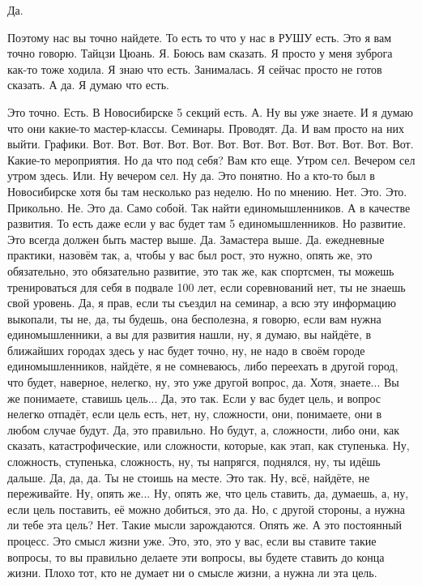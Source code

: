 \I
Да.

\A
Поэтому нас вы точно найдете.
То есть то что у нас в РУШУ есть.
Это я вам точно говорю.
Тайцзи Цюань.
Я.
Боюсь вам сказать.
Я просто у меня зуброга как-то тоже ходила.
Я знаю что есть.
Занималась.
Я сейчас просто не готов сказать.
А да.
Я думаю что есть.

\I
Это точно.
Есть.
В Новосибирске 5 секций есть.
А.
Ну вы уже знаете.
И я думаю что они какие-то мастер-классы.
Семинары.
Проводят.
Да.
И вам просто на них выйти.
Графики.
Вот.
Вот.
Вот.
Вот.
Вот.
Вот.
Вот.
Вот.
Вот.
Вот.
Вот.
Вот.
Вот.
Какие-то мероприятия.
Но да что под себя?
Вам кто еще.
Утром сел.
Вечером сел утром здесь.
Или.
Ну вечером сел.
Ну да.
Это понятно.
Но а кто-то был в Новосибирске хотя бы там несколько раз
неделю.
Но по мнению.
Нет.
Это.
Это.
Прикольно.
Не.
Это да.
Само собой.
Так найти единомышленников.
А в качестве развития.
То есть даже если у вас будет там 5 единомышленников.
Но развитие.
Это всегда должен быть мастер выше.
Да.
Замастера выше.
Да.
ежедневные практики, назовём так, а, чтобы у вас был рост, это нужно, опять же, это обязательно, это обязательно развитие, это так же, как спортсмен, ты можешь тренироваться для себя в подвале 100 лет, если соревнований нет, ты не знаешь свой уровень.
Да, я прав, если ты съездил на семинар, а всю эту информацию выкопали, ты не, да, ты будешь, она бесполезна, я говорю, если вам нужна единомышленники, а вы для развития нашли, ну, я думаю, вы найдёте, в ближайших городах здесь у нас будет точно, ну, не надо в своём городе единомышленников, найдёте, я не сомневаюсь, либо переехать в другой город, что будет, наверное, нелегко, ну, это уже другой вопрос, да.
Хотя, знаете...
Вы же понимаете, ставишь цель...
Да, это так.
Если у вас будет цель, и вопрос нелегко отпадёт, если цель есть, нет, ну, сложности, они, понимаете, они в любом случае будут.
Да, это правильно.
Но будут, а, сложности, либо они, как сказать, катастрофические, или сложности, которые, как этап, как ступенька.
Ну, сложность, ступенька, сложность, ну, ты напрягся, поднялся, ну, ты идёшь дальше.
Да, да, да.
Ты не стоишь на месте.
Это так.
Ну, всё, найдёте, не переживайте.
Ну, опять же...
Ну, опять же, что цель ставить, да, думаешь, а, ну, если цель поставить, её можно добиться, это да.
Но, с другой стороны, а нужна ли тебе эта цель?
Нет.
Такие мысли зарождаются.
Опять же.
А это постоянный процесс.
Это смысл жизни уже.
Это, это, это у вас, если вы ставите такие вопросы, то вы правильно делаете эти вопросы, вы будете ставить до конца жизни.
Плохо тот, кто не думает ни о смысле жизни, а нужна ли эта цель.
